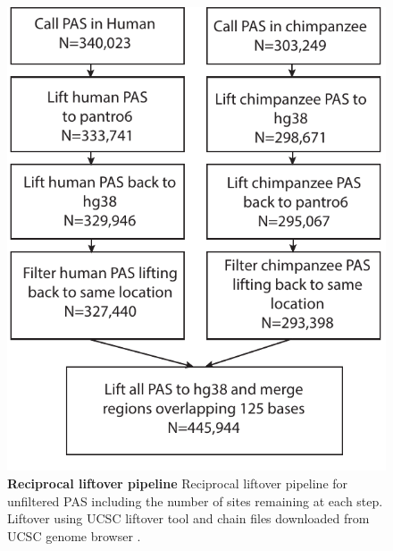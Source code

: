 \begin{figure}[!htb]
\centering
\includegraphics[width=5in]{img/ch03/Fig1_figSup10.pdf}
\caption[Reciprocal liftover pipeline]{\textbf{Reciprocal liftover pipeline} Reciprocal liftover pipeline for unfiltered PAS including the number of sites remaining at each step. Liftover using UCSC liftover tool and chain files downloaded from UCSC genome browser \citep{kent_human_2002}. }
\label{fig:ch03-liftover}
\end{figure}
\clearpage

